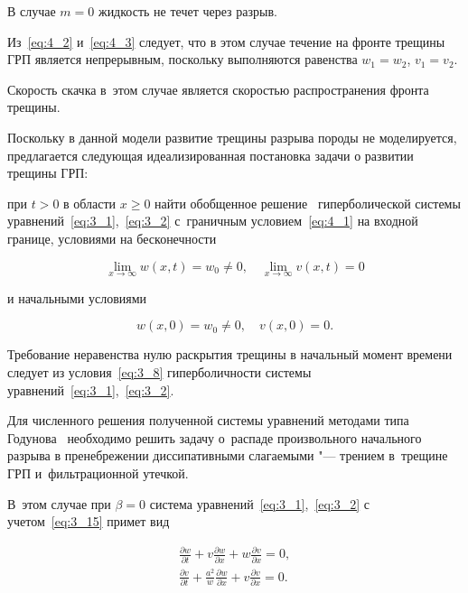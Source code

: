 В случае $m = 0$ жидкость не течет через разрыв. 

Из~\eqref{eq:4_2} и~\eqref{eq:4_3} следует, что в этом случае течение на фронте трещины ГРП является непрерывным, поскольку выполняются равенства $w_1 =w_2$, $ v_1 = v_2$. 

Скорость скачка в~этом случае является скоростью распространения фронта трещины.



Поскольку в данной модели развитие трещины разрыва породы не моделируется, предлагается следующая идеализированная постановка задачи о развитии трещины ГРП: 

при $t>0$ в области $x \geq 0$  найти обобщенное решение~\cite{rozhd1} гиперболической системы уравнений~\eqref{eq:3_1},~\eqref{eq:3_2} с~граничным условием~\eqref{eq:4_1} на входной границе, условиями на бесконечности

$$

\lim\limits_{x\to \infty} w(x, t) = w_0 \neq 0, \quad \lim\limits_{x\to \infty} v(x, t) = 0  

$$

и начальными условиями

$$

w\left(x, 0\right) = w_0 \neq 0, \quad  v\left(x, 0\right) = 0 . 

$$



Требование неравенства нулю раскрытия трещины в начальный момент времени следует из условия~\eqref{eq:3_8} гиперболичности системы уравнений~\eqref{eq:3_1},~\eqref{eq:3_2}.



\smallskip




Для численного решения полученной системы уравнений методами типа Годунова~\cite{kulik1} необходимо решить задачу о~распаде произвольного начального разрыва в пренебрежении диссипативными слагаемыми "--- трением в~трещине ГРП и~фильтрационной утечкой. 

В~этом случае при $\beta = 0$ система уравнений~\eqref{eq:3_1},~\eqref{eq:3_2} с учетом~\eqref{eq:3_15} примет вид

\begin{gather}

\frac{\partial w}{\partial t} + v\frac{\partial w}{\partial x}+w\frac{\partial v}{\partial x} =0, \label{eq:5_1} \\

\frac{\partial v}{\partial t} + \frac{a^2}{w}\frac{\partial w}{\partial x}+v\frac{\partial v}{\partial x} =0. \label{eq:5_2}

\end{gather}



